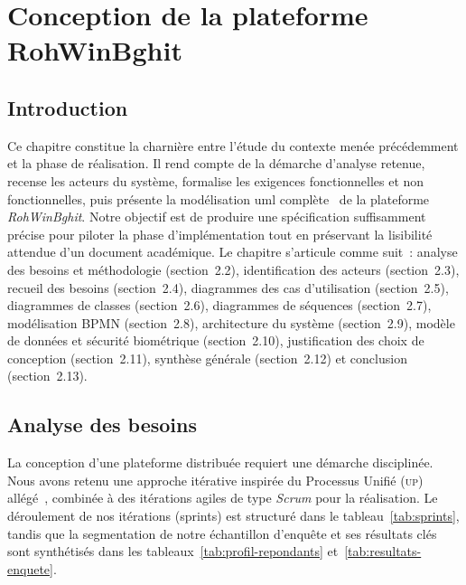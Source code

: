 \chapter{Conception de la plateforme RohWinBghit}
\label{chap:conception}

\section{Introduction}

Ce chapitre constitue la charnière entre l'étude du contexte menée précédemment et la phase de réalisation. Il rend compte de la démarche d'analyse retenue, recense les acteurs du système, formalise les exigences fonctionnelles et non fonctionnelles, puis présente la modélisation \gls{uml} complète~\cite{fowler_uml_2003} de la plateforme \textit{RohWinBghit}. Notre objectif est de produire une spécification suffisamment précise pour piloter la phase d'implémentation tout en préservant la lisibilité attendue d'un document académique. Le chapitre s'articule comme suit~: analyse des besoins et méthodologie (section~2.2), identification des acteurs (section~2.3), recueil des besoins (section~2.4), diagrammes des cas d'utilisation (section~2.5), diagrammes de classes (section~2.6), diagrammes de séquences (section~2.7), modélisation BPMN (section~2.8), architecture du système (section~2.9), modèle de données et sécurité biométrique (section~2.10), justification des choix de conception (section~2.11), synthèse générale (section~2.12) et conclusion (section~2.13).

\section{Analyse des besoins}
\label{sec:methodologie-globale}
\label{sec:methodologie}

La conception d'une plateforme distribuée requiert une démarche disciplinée. Nous avons retenu une approche itérative inspirée du Processus Unifié (\textsc{up}) allégé~\cite{kruchten_up_2004}, combinée à des itérations agiles de type \textit{Scrum} pour la réalisation. Le déroulement de nos itérations (sprints) est structuré dans le tableau~\ref{tab:sprints}, tandis que la segmentation de notre échantillon d'enquête et ses résultats clés sont synthétisés dans les tableaux~\ref{tab:profil-repondants} et~\ref{tab:resultats-enquete}.

